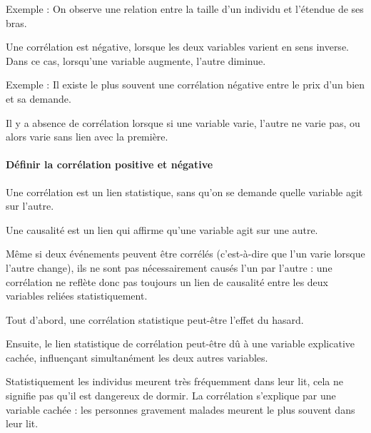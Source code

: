 \documentclass[10pt, a4paper]{article}
\begin{document}
Exemple : On observe une relation entre la taille d'un individu et l'étendue de ses bras.

    Une corrélation est négative, lorsque les deux variables varient en sens inverse. Dans ce cas, lorsqu'une variable augmente, l'autre diminue.

Exemple : Il existe le plus souvent une corrélation négative entre le prix d'un bien et sa demande.

    Il y a absence de corrélation lorsque si une variable varie, l'autre ne varie pas, ou alors varie sans lien avec la première.

\paragraph{Définir la corrélation positive et négative}

    Une corrélation est un lien statistique, sans qu'on se demande quelle variable agit sur l'autre. 
    
    Une causalité est un lien qui affirme qu'une variable agit sur une autre.
    
    Même si deux événements peuvent être corrélés (c'est-à-dire que l'un varie lorsque l'autre change), ils ne sont pas nécessairement causés l'un par l'autre : une corrélation ne reflète donc pas toujours un lien de causalité entre les deux variables reliées statistiquement.
    
    Tout d'abord, une corrélation statistique peut-être l'effet du hasard.
    
    Ensuite, le lien statistique de corrélation peut-être dû à une variable explicative cachée, influençant simultanément les deux autres variables.

Statistiquement les individus meurent très fréquemment dans leur lit, cela ne signifie pas qu'il est dangereux de dormir. La corrélation s'explique par une variable cachée : les personnes gravement malades meurent le plus souvent dans leur lit.
\end{document}
